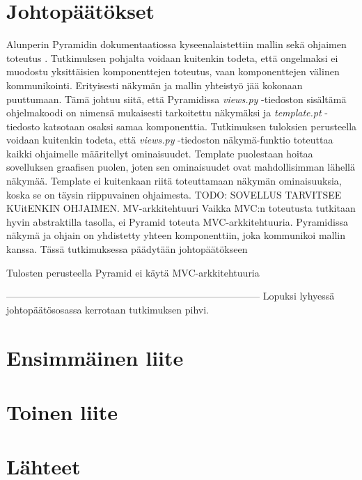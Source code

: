 \documentclass[finnish,utf8,nonumbib,palatino,kandi]{gradu2}
\begin{document}
\section{Johtopäätökset}
Alunperin Pyramidin dokumentaatiossa kyseenalaistettiin mallin sekä ohjaimen toteutus \cite{Pyramid:intr}. Tutkimuksen pohjalta voidaan kuitenkin
todeta, että ongelmaksi ei muodostu yksittäisien komponenttejen toteutus, vaan komponenttejen välinen kommunikointi. Erityisesti näkymän ja mallin yhteistyö jää
kokonaan puuttumaan. Tämä johtuu siitä, että Pyramidissa \emph{views.py} -tiedoston sisältämä ohjelmakoodi on nimensä mukaisesti tarkoitettu näkymäksi ja 
\emph{template.pt} -tiedosto katsotaan osaksi samaa komponenttia. Tutkimuksen tuloksien perusteella voidaan kuitenkin todeta, että \emph{views.py} -tiedoston näkymä-funktio toteuttaa kaikki
ohjaimelle määritellyt ominaisuudet. Template puolestaan hoitaa sovelluksen graafisen puolen, joten sen ominaisuudet ovat mahdollisimman lähellä näkymää. Template ei kuitenkaan riitä toteuttamaan näkymän ominaisuuksia, 
koska se on täysin riippuvainen ohjaimesta. TODO: SOVELLUS TARVITSEE KUitENKIN OHJAIMEN. MV-arkkitehtuuri
Vaikka MVC:n toteutusta tutkitaan hyvin abstraktilla tasolla, ei Pyramid toteuta MVC-arkkitehtuuria. Pyramidissa näkymä ja ohjain on yhdistetty yhteen komponenttiin, joka kommunikoi mallin kanssa. Tässä tutkimuksessa 
päädytään johtopäätökseen


Tulosten perusteella Pyramid ei käytä MVC-arkkitehtuuria


------------------------------------------------------------------------------
Lopuksi lyhyessä johtopäätösosassa kerrotaan tutkimuksen pihvi.




\appendix
\section{Ensimmäinen liite}
\section{Toinen liite}


\section{Lähteet}
\end{document}
